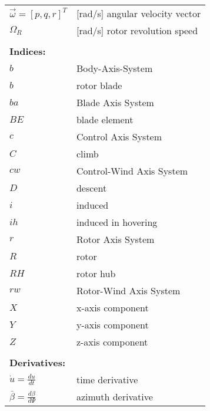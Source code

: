\begin{longtable}[l]{ l p{} }
  $\vec \omega=\left[ p, q, r \right]^T$     & [rad/s] angular velocity vector \\
  $\Omega_R$                                 & [rad/s] rotor revolution speed \\
  & \\
  \multicolumn{2}{l}{\textbf{Indices:}} \\
  $b$   & Body-Axis-System \\
  $b$   & rotor blade \\
  $ba$  & Blade Axis System \\
  $BE$  & blade element \\
  $c$   & Control Axis System \\
  $C$   & climb \\
  $cw$  & Control-Wind Axis System \\
  $D$   & descent \\
  $i$   & induced \\
  $ih$  & induced in hovering \\
  $r$   & Rotor Axis System \\
  $R$   & rotor \\
  $RH$  & rotor hub \\
  $rw$  & Rotor-Wind Axis System \\
  $X$   & x-axis component \\
  $Y$   & y-axis component \\
  $Z$   & z-axis component \\
  & \\
  \multicolumn{2}{l}{\textbf{Derivatives:}} \\
  $\dot u=\frac{du}{dt}$             & time derivative \\
  $\bar \beta=\frac{d\beta}{d\Psi}$  & azimuth derivative \\
\end{longtable}
